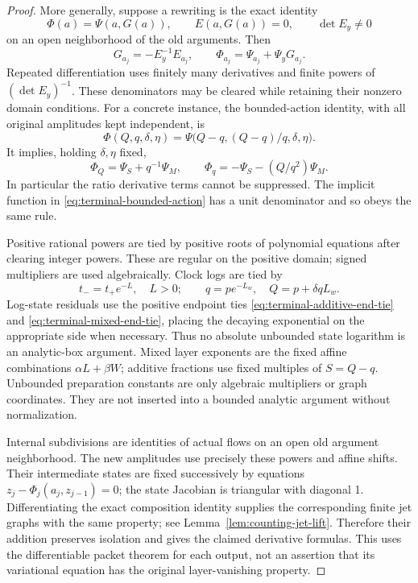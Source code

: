\begin{proof}
More generally, suppose a rewriting is the exact identity
\[
 \Phi(a)=\Psi(a,G(a)),\qquad E(a,G(a))=0,
 \qquad\det E_y\ne0
\]
on an open neighborhood of the old arguments.  Then
\[
 G_{a_j}=-E_y^{-1}E_{a_j},\qquad
 \Phi_{a_j}=\Psi_{a_j}+\Psi_yG_{a_j}.
\]
Repeated differentiation uses finitely many derivatives and finite powers
of \((\det E_y)^{-1}\).  These denominators may be cleared while
retaining their nonzero domain conditions.  For a concrete instance, the
bounded-action identity, with all original amplitudes kept independent, is
\[
 \Phi(Q,q,\delta,\eta)
 =\Psi\bigl(Q-q,(Q-q)/q,\delta,\eta\bigr).
\]
It implies, holding \(\delta,\eta\) fixed,
\begin{equation}\label{eq:terminal-additive-chain-rule}
 \Phi_Q=\Psi_S+q^{-1}\Psi_M,
 \qquad
 \Phi_q=-\Psi_S-(Q/q^2)\Psi_M.
\end{equation}
In particular the ratio derivative terms cannot be suppressed.
The implicit function in \eqref{eq:terminal-bounded-action} has a unit
denominator and so obeys the same rule.

Positive rational powers are tied by positive roots of polynomial
equations after clearing integer powers.  These are regular on the
positive domain; signed multipliers are used algebraically.  Clock logs
are tied by
\begin{equation}\label{eq:terminal-log-ties}
 t_-=t_+e^{-L},\quad L>0;
 \qquad q=pe^{-L_w},\quad Q=p+\delta qL_w.
\end{equation}
Log-state residuals use the positive endpoint ties
\eqref{eq:terminal-additive-end-tie} and
\eqref{eq:terminal-mixed-end-tie}, placing the decaying exponential on
the appropriate side when necessary.  Thus no absolute unbounded state
logarithm is an analytic-box argument.  Mixed layer exponents are the
fixed affine combinations \(\alpha L+\beta W\); additive fractions
use fixed multiples of \(S=Q-q\).  Unbounded preparation constants are
only algebraic multipliers or graph coordinates.  They are not inserted
into a bounded analytic argument without normalization.

Internal subdivisions are identities of actual flows on an open old
argument neighborhood.  The new amplitudes use precisely these powers and
affine shifts.  Their intermediate states are fixed successively by
equations \(z_j-\Phi_j(a_j,z_{j-1})=0\); the state Jacobian is triangular
with diagonal 1.  Differentiating the exact composition identity supplies
the corresponding finite jet graphs with the same property; see
Lemma~\ref{lem:counting-jet-lift}.  Therefore their addition preserves
isolation and gives the claimed derivative formulas.  This uses the
differentiable packet theorem for each output, not an assertion that its
variational equation has the original layer-vanishing property.
\end{proof}


